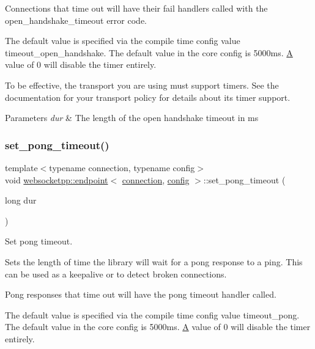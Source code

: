 Connections that time out will have their fail handlers called with the open\+\_\+handshake\+\_\+timeout error code.

The default value is specified via the compile time config value \textquotesingle{}timeout\+\_\+open\+\_\+handshake\textquotesingle{}. The default value in the core config is 5000ms. \mbox{\hyperlink{struct_a}{A}} value of 0 will disable the timer entirely.

To be effective, the transport you are using must support timers. See the documentation for your transport policy for details about its timer support.


\begin{DoxyParams}{Parameters}
{\em dur} & The length of the open handshake timeout in ms \\
\hline
\end{DoxyParams}
\mbox{\label{classwebsocketpp_1_1endpoint_abcb25dde6f71933c3dbe517c45ebe5c6}} 
\subsubsection{\texorpdfstring{set\+\_\+pong\+\_\+timeout()}{set\_pong\_timeout()}}
{\footnotesize\ttfamily template$<$typename connection, typename config$>$ \\
void \mbox{\hyperlink{classwebsocketpp_1_1endpoint}{websocketpp\+::endpoint}}$<$ \mbox{\hyperlink{classwebsocketpp_1_1connection}{connection}}, \mbox{\hyperlink{classconfig}{config}} $>$\+::set\+\_\+pong\+\_\+timeout (\begin{DoxyParamCaption}\item[{long}]{dur }\end{DoxyParamCaption})\hspace{0.3cm}{\ttfamily [inline]}}



Set pong timeout. 

Sets the length of time the library will wait for a pong response to a ping. This can be used as a keepalive or to detect broken connections.

Pong responses that time out will have the pong timeout handler called.

The default value is specified via the compile time config value \textquotesingle{}timeout\+\_\+pong\textquotesingle{}. The default value in the core config is 5000ms. \mbox{\hyperlink{struct_a}{A}} value of 0 will disable the timer entirely.


